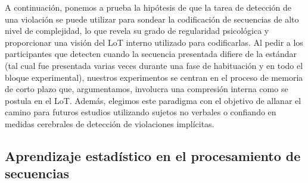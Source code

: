 
A continuación, ponemos a prueba la hipótesis de que la tarea de detección de una violación se puede utilizar para sondear la codificación de secuencias de alto nivel de complejidad, lo que revela su grado de regularidad psicológica y proporcionar una visión del LoT interno utilizado para codificarlas. Al pedir a los participantes que detecten cuando la secuencia presentada difiere de la estándar (tal cual fue presentada varias veces durante una fase de habituación y en todo el bloque experimental), nuestros experimentos se centran en el proceso de memoria de corto plazo que, argumentamos, involucra una compresión interna como se postula en el LoT. Además, elegimos este paradigma con el objetivo de allanar el camino para futuros estudios utilizando sujetos no verbales o confiando en medidas cerebrales de detección de violaciones implícitas.

\subsection{Aprendizaje estadístico en el procesamiento de secuencias}


